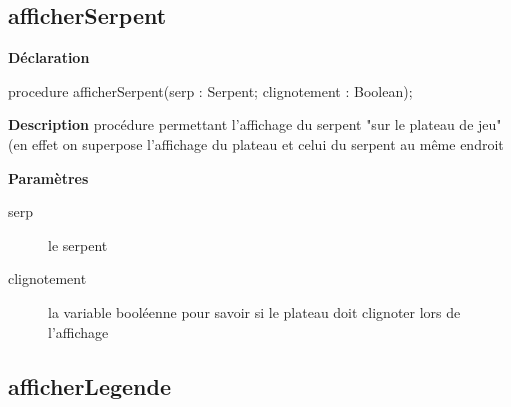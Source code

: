 \documentclass{report}
\newif\ifpdf
\begin{document}
\subsection*{afficherSerpent}
\fi
\label{Affichage-afficherSerpent}
\begin{list}{}{
\setlength{\itemindent}{0cm}
\setlength{\listparindent}{0cm}
\setlength{\leftmargin}{\evensidemargin}
\addtolength{\leftmargin}{\tmplength}
\settowidth{\labelsep}{X}
\addtolength{\leftmargin}{\labelsep}
\setlength{\labelwidth}{\tmplength}
}
\item[\textbf{Déclaration}\hfill]
\ifpdf
\begin{flushleft}
\fi
\begin{ttfamily}
procedure afficherSerpent(serp : Serpent; clignotement : Boolean);\end{ttfamily}

\ifpdf
\end{flushleft}
\fi

\par
\item[\textbf{Description}]
procédure permettant l'affichage du serpent "sur le plateau de jeu" (en effet on superpose l'affichage du plateau et celui du serpent au même endroit  \par
\item[\textbf{Paramètres}]
\begin{description}
\item[serp] le serpent
\item[clignotement] la variable booléenne pour savoir si le plateau doit clignoter lors de l'affichage
\end{description}


\end{list}
\ifpdf
\subsection*{\large{\textbf{afficherLegende}}\normalsize\hspace{1ex}\hrulefill}
\else
\end{document}
